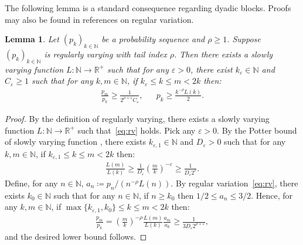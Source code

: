 \documentclass[12pt,reqno]{amsart}
\theoremstyle{definition}
\theoremstyle{plain}
\newtheorem{lemma}{Lemma}
\begin{document}
The following lemma is a standard consequence regarding dyadic blocks. Proofs may also be found in references on regular variation.
\begin{lemma}\label{lem:potter}
Let $(p_k)_{k\in\mathbb{N}}$ be a probability sequence and $\rho\geq 1$.
Suppose $(p_k)_{k\in\mathbb{N}}$ is regularly varying with tail index $\rho$.
Then there exists a slowly varying function $L:\mathbb{N}\to\mathbb{R}^+$ such that for any $\varepsilon>0$, there exist $k_{\varepsilon}\in\mathbb{N}$ and $C_\varepsilon\geq 1$ such that for any $k,m\in\mathbb{N}$, if $k_{\varepsilon}\leq k\leq m<2k$ then:
\begin{align*}
    \frac{p_m}{p_k}
    \geq\frac{1}{2^{\rho+\varepsilon}C_\varepsilon}, &&
    p_k\geq\frac{k^{-\rho}L(k)}{2}
    .
\end{align*}
\end{lemma}
\begin{proof}
    By the definition of regularly varying, there exists a slowly varying function $L:\mathbb{N}\to\mathbb{R}^+$ such that~\eqref{eq:rv} holds.
    Pick any $\varepsilon>0$.
    By the Potter bound of slowly varying function \cite[Theorem 1.5.6]{BinghamGoldieTeugels1987}, there exists $ k_{\varepsilon,1}\in\mathbb{N}$ and $D_\varepsilon>0$ such that for any $k,m\in\mathbb{N}$, if $k_{\varepsilon,1}\leq k\leq m<2k$ then:
    \begin{align*}
        \frac{L(m)}{L(k)}
        \geq\frac{1}{D_\varepsilon}\left(\frac{m}{k}\right)^{-\varepsilon}
        \geq\frac{1}{D_\varepsilon2^{\varepsilon}}.
    \end{align*}
    Define, for any $n\in\mathbb{N}$, $a_n\coloneqq p_n /(n^{-\rho}L(n))$.
    By regular variation~\eqref{eq:rv}, there exists $k_0\in\mathbb{N}$ such that for any $n\in\mathbb{N}$, if $n\geq k_0$ then $1/2\leq a_n\leq 3/2$. Hence, for any $k,m\in\mathbb{N}$, if $\max{\{k_{\varepsilon,1},k_0\}}\leq k\leq m<2k$ then:
    \begin{align*}
        \frac{p_m}{p_k}=\left(\frac{m}{k}\right)^{-\rho}\frac{L(m)}{L(k)}\frac{a_m}{a_k}\geq\frac{1}{3D_\varepsilon2^{\rho+\varepsilon}},
    \end{align*}
    and the desired lower bound follows.
\end{proof}
\end{document}
